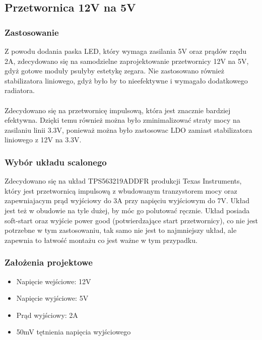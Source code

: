\documentclass{article}
\begin{document}
\subsection{Przetwornica 12V na 5V}
\subsubsection{Zastosowanie}
Z powodu dodania paska LED, który wymaga zasilania 5V oraz prądów rzędu 2A, zdecydowano się na samodzielne zaprojektowanie przetwornicy 12V na 5V, gdyż gotowe moduły
psułyby estetykę zegara. Nie zastosowano również stabilizatora liniowego, gdyż było by to nieefektywne i wymagało dodatkowego radiatora.
\\\\
Zdecydowano się na przetwornicę impulsową, która jest znacznie bardziej efektywna. Dzięki temu również można było zminimalizować straty mocy na zasilaniu linii 3.3V, ponieważ
można było zastosowac LDO zamiast stabilizatora liniowego z 12V na 3.3V.

\subsubsection{Wybór układu scalonego}
Zdecydowano się na układ TPS563219ADDFR produkcji Texas Instruments, który jest przetwornicą impulsową z wbudowanym tranzystorem mocy oraz zapewniajacym prąd wyjściowy do 3A przy 
napięciu wyjściowym do 7V. Układ jest też w obudowie na tyle dużej, by móc go polutować ręcznie. Układ posiada soft-start oraz wyjście power good (potwierdzające start przetwornicy), co nie jest potrzebne w tym zastosowaniu, tak samo 
nie jest to najmniejszy układ, ale zapewnia to łatwość montażu co jest ważne w tym przypadku.

\subsubsection{Założenia projektowe}
\begin{itemize}
    \item Napięcie wejściowe: 12V
    \item Napięcie wyjściowe: 5V
    \item Prąd wyjściowy: 2A
    \item 50mV tętnienia napięcia wyjściowego
\end{itemize}
\end{document}
